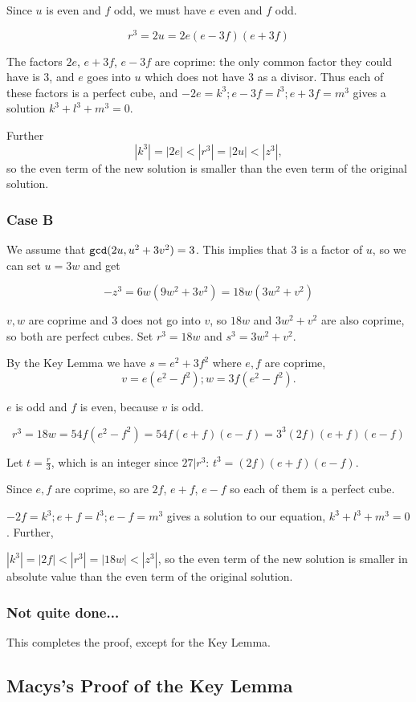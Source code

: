 \documentclass[12pt]{article}
\begin{document}
Since $u$ is even and $f$ odd, we must have $e$ even and $f$ odd.

$$r^3=2u=2e(e-3f)(e+3f)$$

The factors $2e$, $e+3f$, $e-3f$ are coprime:  the only common factor they could have is 3, and $e$ goes into $u$ which does not have 3 as a divisor.
Thus each of these factors is a perfect cube, and $-2e=k^3; e-3f=l^3; e+3f=m^3$ gives a solution $k^3+l^3+m^3=0$.

Further $$|k^3|=|2e|<|r^3|=|2u|<|z^3|,$$ so the even term of the new solution is smaller than the even term of the original solution.

\subsubsection{Case B}

We assume that ${\tt gcd}(2u,u^2+3v^2)=3$.  This implies that 3 is a factor of $u$, so we can set $u=3w$ and get

$$-z^3=6w(9w^2+3v^2)=18w(3w^2+v^2)$$

$v,w$ are coprime and 3 does not go into $v$, so $18w$ and $3w^2+v^2$ are also coprime, so both are perfect cubes.  Set
$r^3=18w$ and $s^3=3w^2+v^2$.

By the Key Lemma we have  $s=e^2+3f^2$ where $e,f$ are coprime, $$v=e(e^2-f^2); w=3f(e^2-f^2).$$

$e$ is odd and $f$ is even, because $v$ is odd.

$$r^3=18w=54f(e^2-f^2)=54f(e+f)(e-f)=3^3(2f)(e+f)(e-f)$$

Let $t=\frac r3$, which is an integer since $27|r^3$:  $t^3=(2f)(e+f)(e-f)$.

Since $e,f$ are coprime, so are $2f$, $e+f$, $e-f$ so each of them is a perfect cube.

$-2f=k^3; e+f=l^3; e-f=m^3$ gives a solution to our equation, $k^3+l^3+m^3=0$.   Further, 

$|k^3| = |2f| < |r^3| = |18w| < |z^3|$, so the even term of the new solution is smaller in absolute value than the even term of the original solution.


\subsubsection{Not quite done...}
This completes the proof, except for the Key Lemma.

\subsection{Macys's Proof of the Key Lemma}
\end{document}
